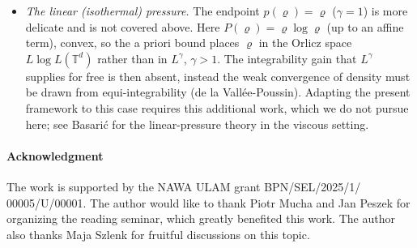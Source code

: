 \documentclass[12pt,a4paper,twoside]{article}
\newcommand{\vr}{\varrho}
\numberwithin{equation}{section}%
\begin{document}
\begin{itemize}[leftmargin=*]
	\item \emph{The linear (isothermal) pressure.} The endpoint $p(\vr)=\vr$ ($\gamma=1$) is
	more delicate and is not covered above. Here $P(\vr)=\vr\log\vr$ (up to an affine term),
	convex, so the a priori bound places $\vr$ in the
	Orlicz space $L\log L(\mathbb T^d)$ rather than in $L^\gamma$, $\gamma>1$. The integrability
	gain that $L^\gamma$ supplies for free is then absent, instead the weak convergence of density must be drawn from equi-integrability (de la Vall\'ee-Poussin). Adapting the present framework to
	this case requires this additional work, which we do not pursue here; see Basari\'c \cite{B2021} for
	the linear-pressure theory in the viscous setting.
\end{itemize}
\paragraph{Acknowledgment}
The work is supported by the NAWA ULAM grant BPN/SEL/2025/1/ 00005/U/00001. The author would like to thank Piotr Mucha and Jan Peszek for organizing the reading seminar, which greatly benefited this work. The author also thanks Maja Szlenk for fruitful discussions on this topic.

	
	
	
	
\end{document}
